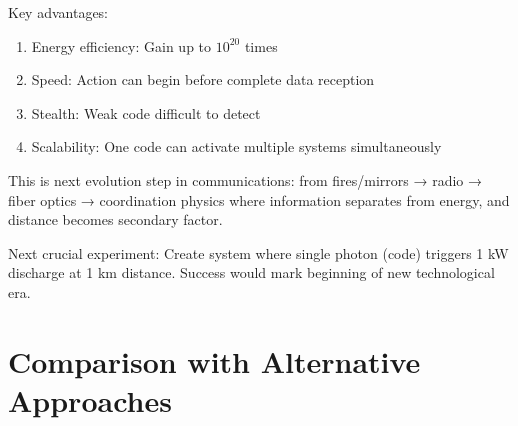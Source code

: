 \documentclass[11pt,a4paper]{article}
\begin{document}
	Key advantages:
	\begin{enumerate}
		\item Energy efficiency: Gain up to $10^{20}$ times
		\item Speed: Action can begin before complete data reception
		\item Stealth: Weak code difficult to detect
		\item Scalability: One code can activate multiple systems simultaneously
	\end{enumerate}
	
	This is next evolution step in communications: from fires/mirrors → radio → fiber optics → coordination physics where information separates from energy, and distance becomes secondary factor.
	
	Next crucial experiment: Create system where single photon (code) triggers 1 kW discharge at 1 km distance. Success would mark beginning of new technological era.
	\section{Comparison with Alternative Approaches}
\end{document}
